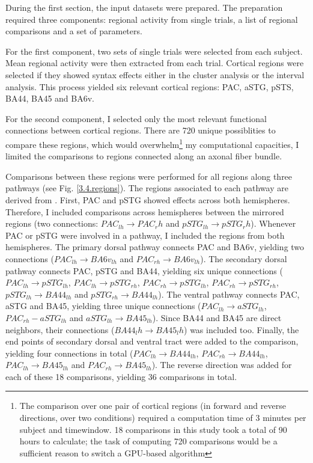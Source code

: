 During the first section, the input datasets were prepared.
The preparation required three components: regional activity from single trials, a list of regional comparisons and a set of parameters.

For the first component, two sets of single trials were selected from each subject.
Mean regional activity were then extracted from each trial.
Cortical regions were selected if they showed syntax effects either in the cluster analysis or the interval analysis.
This process yielded six relevant cortical regions: PAC, aSTG, pSTS, BA44, BA45 and BA6v.

For the second component, I selected only the most relevant functional connections between cortical regions.
There are 720 unique possiblities to compare these regions, which would overwhelm\footnote{The comparison over one pair of cortical regions (in forward and reverse directions, over two conditions) required a computation time of 3 minutes per subject and timewindow. 18 comparisons in this study took a total of 90 hours to calculate; the task of computing 720 comparisons would be a sufficient reason to switch a GPU-based algorithm\cite{3.4.gpuTE}} my computational capacities, I limited the comparisons to regions connected along an axonal fiber bundle.

Comparisons between these regions were performed for all regions along three pathways (see Fig. \ref{3.4.regions}).
The regions associated to each pathway are derived from \cite{3.4.pathways}.
First, PAC and pSTG showed effects across both hemispheres.
Therefore, I included comparisons across hemispheres between the mirrored regions (two connections: $PAC_{lh} \rightarrow PAC_rh$ and $pSTG_{lh} \rightarrow pSTG_rh$).
Whenever PAC or pSTG were involved in a pathway, I included the regions from both hemispheres.
The primary dorsal pathway connects PAC and BA6v, yielding two connections ($PAC_{lh} \rightarrow BA6v_{lh}$ and $PAC_{rh} \rightarrow BA6v_{lh}$).
The secondary dorsal pathway connects PAC, pSTG and BA44, yielding six unique connections ($PAC_{lh} \rightarrow pSTG_{lh}$, $PAC_{lh} \rightarrow pSTG_{rh}$, $PAC_{rh} \rightarrow pSTG_{lh}$, $PAC_{rh} \rightarrow pSTG_{rh}$, $pSTG_{lh} \rightarrow BA44_{lh}$ and $pSTG_{rh} \rightarrow BA44_{lh}$).
The ventral pathway connects PAC, aSTG and BA45, yielding three unique connections ($PAC_{lh} \rightarrow aSTG_{lh}$, $PAC_{rh}-aSTG_{lh}$ and $aSTG_{lh} \rightarrow BA45_{lh}$).
Since BA44 and BA45 are direct neighbors, their connections ($BA44_lh \rightarrow BA45_lh$) was included too.
Finally, the end points of secondary dorsal and ventral tract were added to the comparison, yielding four connections in total ($PAC_{lh} \rightarrow BA44_{lh}$, $PAC_{rh} \rightarrow BA44_{lh}$, $PAC_{lh} \rightarrow BA45_{lh}$ and $PAC_{rh} \rightarrow BA45_{lh}$).
The reverse direction was added for each of these 18 comparisons, yielding 36 comparisons in total.


